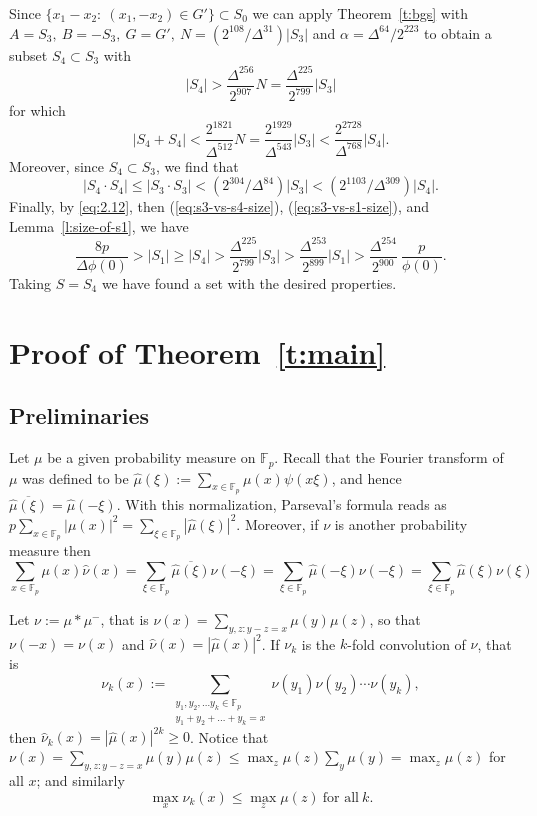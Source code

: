 \documentclass[11pt]{amsart}
\newcommand{\fp}{\mathbb{F}_p}
\newcommand{\nuhat}{{\widehat{\nu}}}
\newcommand{\muhat}{{\widehat{\mu}}}
\begin{document}
Since $\{ x_1 - x_2:\  (x_1, -x_2) \in G'\} \subset S_0$ we can
apply Theorem~\ref{t:bgs} with $A=S_3,\ B=-S_3,\ G=G',\
N=(2^{108}/\Delta^{31})|S_3|$ and $\alpha = \Delta^{64}/2^{223}$ to
obtain a subset $S_4 \subset S_3$ with
\begin{equation}
\label{eq:s3-vs-s4-size} |S_4| > \frac{\Delta^{256}}{2^{907}}N =
\frac{\Delta^{225}}{2^{799}} |S_3|
\end{equation}
for which
$$
|S_4+S_4|  < \frac{2^{1821}}{\Delta^{512}} N =
\frac{2^{1929}}{\Delta^{543}}  |S_3| < \frac{2^{2728}}{\Delta^{768}}
|S_4| .
$$
Moreover, since $S_4 \subset S_3$, we find that
$$
|S_4 \cdot S_4| \leq |S_3 \cdot S_3| < (2^{304}/\Delta^{84})  |S_3|
 < (2^{1103}/\Delta^{309})  |S_4| .
$$
Finally, by \eqref{eq:2.12}, then (\ref{eq:s3-vs-s4-size}),
(\ref{eq:s3-vs-s1-size}), and Lemma~\ref{l:size-of-s1}, we have
$$
\frac{8p}{\Delta\phi(0)} > |S_1|\geq |S_4| >
\frac{\Delta^{225}}{2^{799}} |S_3| > \frac{\Delta^{253}}{2^{899}}
 |S_1|   > \frac{\Delta^{254}}{2^{900}}  \  \frac{p}{ \phi(0)}
.
$$
Taking $S=S_4$ we have found a set with the desired properties.








\section{Proof of Theorem~\ref{t:main}}
\label{sec:proof-theorem}
\subsection{Preliminaries}
\label{subsec:prelims}

Let $\mu$ be a given probability measure on $\fp$.  Recall that the
Fourier transform of $\mu$ was defined to be $\muhat(\xi) := \sum_{x \in
  \fp} \mu(x) \psi(x \xi)$, and hence
$\overline{\muhat(\xi)}=\muhat(-\xi)$.  With this normalization,
Parseval's formula reads as $ p \sum_{x \in \fp} |\mu(x)|^2 =
\sum_{\xi \in \fp} |\muhat(\xi)|^2$.  Moreover, if $\nu$ is another
probability measure then
$$
\sum_{x \in \fp} \mu(x) \nuhat(x) = \sum_{\xi \in \fp}
\overline{\muhat(\xi)} \nu(-\xi) = \sum_{\xi \in \fp} \muhat(-\xi)
\nu(-\xi) = \sum_{\xi \in \fp} \muhat(\xi) \nu(\xi)
$$


Let $\nu := \mu \ast \mu^-$, that is $\nu(x) = \sum_{y,z: y-z=x}
\mu(y) \mu(z)$, so that $\nu(-x)=\nu(x)$ and $\nuhat(x) =
|\muhat(x)|^2$. If $\nu_k$ is the $k$-fold convolution of $\nu$,
that is
$$
\nu_k(x) :=
\sum_{\substack{y_1, y_2, \ldots y_k \in \fp \\
y_1+ y_2+ \ldots +y_k = x }} \nu(y_1)  \nu(y_2) \cdots \nu(y_k),
$$
then $\nuhat_k(x) = |\muhat(x)|^{2k} \geq 0$. Notice that
$\nu(x)=\sum_{y,z: y-z=x} \mu(y) \mu(z)\leq \max_z \mu(z)\sum_{y}
\mu(y) =\max_z \mu(z)$ for all $x$; and similarly
\begin{equation} \label{eq:bounded-sup-norm}
\max_x \nu_k(x) \leq \max_z \mu(z) \ \text{for all} \ k.
\end{equation}
\end{document}

